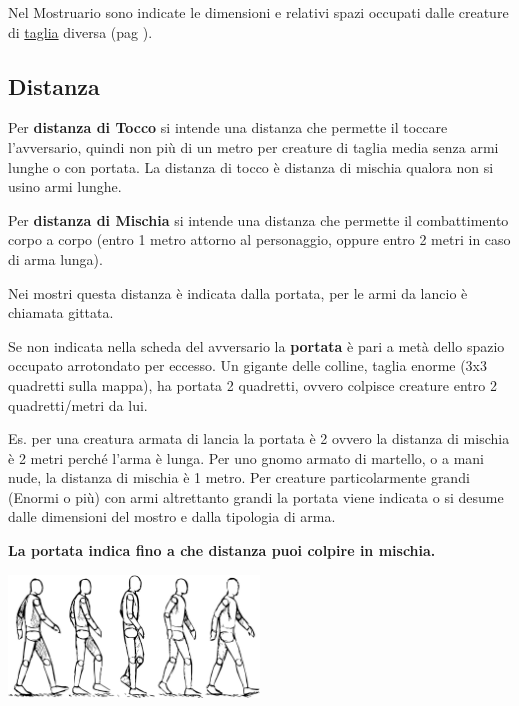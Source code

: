 \begin{multicols}{2}
Nel Mostruario sono indicate le dimensioni e relativi spazi occupati dalle creature di \hyperlink{tagliaedimensioni}{taglia} diversa (pag \pageref{tagliaedimensioni}).

\subsection{Distanza}\label{distanza}

Per \textbf{distanza di Tocco}  si intende una distanza che permette il toccare l'avversario, quindi non più di un metro per creature di taglia media senza armi lunghe o con portata. La distanza di tocco è distanza di mischia qualora non si usino armi lunghe.

Per \textbf{distanza di Mischia}  si intende una distanza che permette il combattimento corpo a corpo (entro 1 metro attorno al personaggio, oppure entro 2 metri in caso di arma lunga).

Nei mostri questa distanza è indicata dalla portata, per le armi da lancio è chiamata gittata.

Se non indicata nella scheda del avversario la \textbf{portata} è pari a metà dello spazio occupato arrotondato per eccesso. Un gigante delle colline, taglia enorme (3x3 quadretti sulla mappa), ha portata 2 quadretti, ovvero colpisce creature entro 2 quadretti/metri da lui.

\begin{narratore}
Es. per una creatura armata di lancia la portata è 2 ovvero la distanza di mischia è 2 metri perché l'arma è lunga. Per uno gnomo armato di martello, o a mani nude, la distanza di mischia è 1 metro. Per creature particolarmente grandi (Enormi o più) con armi altrettanto grandi la portata viene indicata o si desume dalle dimensioni del mostro e dalla tipologia di arma.

\textbf{La portata indica fino a che distanza puoi colpire in mischia.}
\end{narratore}

\end{multicols}

\vfill

\begin{center}
	\includegraphics[width=0.5\textwidth]{immagini/camminata.png}
\end{center}

